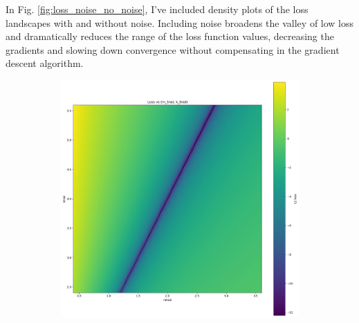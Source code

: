 \documentclass[]{article}
\begin{document}
In Fig. \ref{fig:loss_noise_no_noise}, I've included density plots of the loss landscapes with and without noise. Including noise broadens the valley of low loss and dramatically reduces the range of the loss function values, decreasing the gradients and slowing down convergence without compensating in the gradient descent algorithm.

\begin{figure}[H]
	\caption{Loss landscape with and without noise}
	\begin{subfigure}{.5\textwidth}
		\centering
		\includegraphics[scale=0.20]{loss-landscape.png}
		\label{subfig:loss-landscape}
	\end{subfigure}
	\begin{subfigure}{.5\textwidth}
		\centering

\end{subfigure}
\end{figure}
\end{document}
